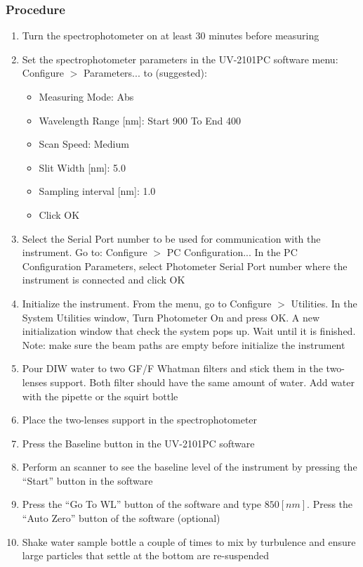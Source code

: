 \begin{appendices}
\subsubsection{Procedure}
\begin{enumerate}[itemsep=2pt,parsep=2pt]
  \item Turn the spectrophotometer on at least 30 minutes before measuring
  \item Set the spectrophotometer parameters in the UV-2101PC software menu: Configure $>$ Parameters... to (suggested):
  \begin{itemize}[itemsep=2pt,parsep=2pt]
    \item Measuring Mode: Abs
    \item Wavelength Range [nm]: Start 900 To End 400
    \item Scan Speed: Medium
    \item Slit Width [nm]: 5.0
    \item Sampling interval [nm]: 1.0
    \item Click OK
  \end{itemize}
  \item Select the Serial Port number to be used for communication with the instrument. Go to: Configure $>$ PC Configuration... In the PC Configuration Parameters, select Photometer Serial Port number where the instrument is connected and click OK
  \item Initialize the instrument. From the menu, go to Configure $>$ Utilities. In the System Utilities window, Turn Photometer On and press OK. A new initialization window that check the system pops up. Wait until it is finished. Note: make sure the beam paths are empty before initialize the instrument
  \item Pour DIW water to two GF/F Whatman filters and stick them in the two-lenses support. Both filter should have the same amount of water. Add water with the pipette or the squirt bottle
  \item Place the two-lenses support in the spectrophotometer
  \item Press the Baseline button in the UV-2101PC software
  \item Perform an scanner to see the baseline level of the instrument by pressing the ``Start'' button in the software
  \item Press the ``Go To WL'' button of the software and type $850 [nm]$. Press the ``Auto Zero'' button of the software (optional)
  \item Shake water sample bottle a couple of times to mix by turbulence and ensure large particles that settle at the bottom are re-suspended \citep{Mitchell2002}

\end{enumerate}
\end{appendices}
